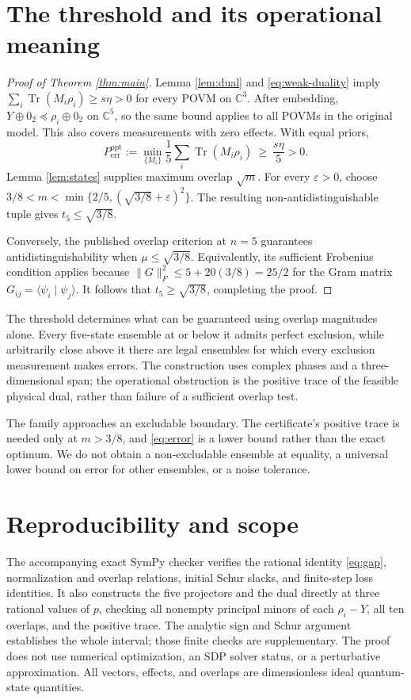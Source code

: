 \documentclass[11pt]{article}
\newcommand{\Tr}{\operatorname{Tr}}
\newcommand{\C}{\mathbb C}
\begin{document}
\section{The threshold and its operational meaning}
\begin{proof}[Proof of Theorem \ref{thm:main}]
Lemma \ref{lem:dual} and \eqref{eq:weak-duality} imply
$\sum_i\Tr(M_i\rho_i)\geq s\eta>0$ for every POVM on $\C^3$.
After embedding, $Y\oplus0_2\preceq\rho_i\oplus0_2$ on $\C^5$,
so the same bound applies to all POVMs in the original model.
This also covers measurements with zero effects. With equal priors,
\begin{equation}
 P_{\mathrm{err}}^{\mathrm{opt}}
  :=\min_{\{M_i\}}\frac15\sum_i\Tr(M_i\rho_i)
  \ \geq\ \frac{s\eta}{5}>0 .
 \label{eq:error}
\end{equation}
Lemma \ref{lem:states} supplies maximum overlap $\sqrt m$.
For every $\varepsilon>0$, choose
$3/8<m<\min\{2/5,(\sqrt{3/8}+\varepsilon)^2\}$.
The resulting non-antidistinguishable tuple gives
$t_5\leq\sqrt{3/8}$.

Conversely, the published overlap criterion
\cite[Corollary 5.4]{JRS25} at $n=5$ guarantees
antidistinguishability when $\mu\leq\sqrt{3/8}$.
Equivalently, its sufficient Frobenius condition applies because
$\|G\|_F^2\leq5+20(3/8)=25/2$ for the Gram matrix
$G_{ij}=\langle\psi_i\mid\psi_j\rangle$.
It follows that $t_5\geq\sqrt{3/8}$, completing the proof.
\end{proof}

The threshold determines what can be guaranteed using overlap
magnitudes alone. Every five-state ensemble at or below it admits
perfect exclusion, while arbitrarily close above it there are legal
ensembles for which every exclusion measurement makes errors.
The construction uses complex phases and a three-dimensional span;
the operational obstruction is the positive trace of the feasible
physical dual, rather than failure of a sufficient overlap test.

The family approaches an excludable boundary. The certificate's
positive trace is needed only at $m>3/8$, and \eqref{eq:error}
is a lower bound rather than the exact optimum. We do not obtain
a non-excludable ensemble at equality, a universal lower bound on
error for other ensembles, or a noise tolerance.

\section{Reproducibility and scope}
The accompanying exact SymPy checker verifies the rational identity
\eqref{eq:gap}, normalization and overlap relations, initial Schur
slacks, and finite-step loss identities. It also constructs the five
projectors and the dual directly at three rational values of $p$,
checking all nonempty principal minors of each $\rho_i-Y$, all ten
overlaps, and the positive trace. The analytic sign and Schur argument
establishes the whole interval; those finite checks are supplementary.
The proof does not use numerical optimization, an SDP solver status,
or a perturbative approximation. All vectors, effects, and overlaps
are dimensionless ideal quantum-state quantities.
\end{document}
